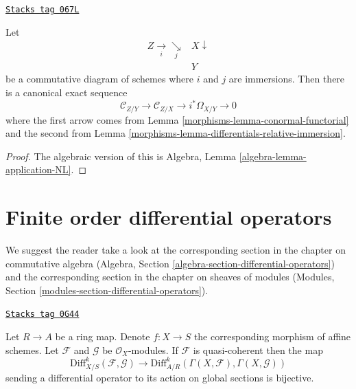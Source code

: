 \begin{lemma}
\label{morphisms-lemma-two-immersions}
\href{https://stacks.math.columbia.edu/tag/067L}{\texttt{Stacks tag 067L}}

Let
$$
\begin{array}{cc}Z \underset{i}{\longrightarrow}\underset{j}{\searrow} & X \downarrow \\  & Y\end{array}
$$
be a commutative diagram of schemes where $i$ and $j$ are immersions.
Then there is a canonical exact sequence
$$
\mathcal{C}_{Z/Y} \to
\mathcal{C}_{Z/X} \to
i^*\Omega_{X/Y} \to 0
$$
where the first arrow comes from
Lemma \ref{morphisms-lemma-conormal-functorial}
and the second from
Lemma \ref{morphisms-lemma-differentials-relative-immersion}.
\end{lemma}

\begin{proof}
The algebraic version of this is
Algebra, Lemma \ref{algebra-lemma-application-NL}.
\end{proof}

\section{Finite order differential operators}
\label{morphisms-section-differential-operators}
We suggest the reader take a look at the corresponding section
in the chapter on commutative algebra
(Algebra, Section \ref{algebra-section-differential-operators})
and the corresponding section in the chapter on sheaves of modules
(Modules, Section \ref{modules-section-differential-operators}).

\begin{lemma}
\label{morphisms-lemma-affine-case-differential-operators}
\href{https://stacks.math.columbia.edu/tag/0G44}{\texttt{Stacks tag 0G44}}

Let $R \to A$ be a ring map. Denote $f : X \to S$ the corresponding
morphism of affine schemes. Let $\mathcal{F}$ and $\mathcal{G}$
be $\mathcal{O}_X$-modules. If $\mathcal{F}$ is quasi-coherent then
the map
$$
\text{Diff}^k_{X/S}(\mathcal{F}, \mathcal{G}) \to
\text{Diff}^k_{A/R}(\Gamma(X, \mathcal{F}), \Gamma(X, \mathcal{G}))
$$
sending a differential operator to its action on global sections
is bijective.
\end{lemma}

